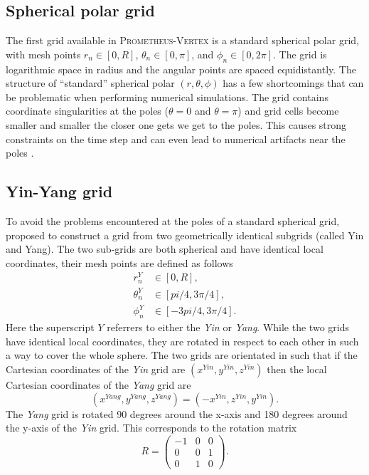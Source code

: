 \subsection{Spherical polar grid}
The first grid available in \textsc{Prometheus-Vertex} is a standard spherical polar grid, 
with mesh points $r_n \in [0, R]$, $\theta_n \in [0, \pi]$, and $\phi_n \in [0, 2\pi]$.
The grid is logarithmic space in radius and the angular points are spaced equidistantly.  
The structure of ``standard'' spherical polar $(r, \theta, \phi)$ has a few shortcomings that
can be problematic when performing numerical simulations. 
The grid contains coordinate singularities at the poles ($\theta = 0$ and $\theta = \pi$)
and grid cells become smaller and smaller the closer one gets we get to the poles. This causes strong constraints on the time step and
can even lead to numerical artifacts near the poles \citep{wongwathanarat_10a,mueller_15b}.

\subsection{Yin-Yang grid}
To avoid the problems encountered at the poles of a standard spherical grid, \cite{kageyama_04} proposed to
construct a grid from two geometrically identical subgrids (called Yin and Yang). 
The two sub-grids are both spherical and have identical local coordinates, their mesh points are defined as follows
\begin{align}
r_n^{Y} &\in [0, R], \\
\theta_n^{Y} &\in [pi/4, 3\pi/4], \\
\phi_n^{Y} &\in [-3pi/4, 3\pi/4].
\end{align} 
Here the superscript $Y$ referrers to either the \textit{Yin} or \textit{Yang}. While the two grids
have identical local coordinates, they are rotated in respect to each other in such a way
to cover the whole sphere. The two grids are orientated in such that if 
the Cartesian coordinates of the \textit{Yin} grid are $(x^{Yin},y^{Yin},z^{Yin})$
then the local Cartesian coordinates of the \textit{Yang} grid are
\begin{equation}
(x^{Yang},y^{Yang},z^{Yang}) = (-x^{Yin},z^{Yin},y^{Yin}).
\end{equation} 
The \textit{Yang} grid is rotated 90 degrees around the x-axis
and 180 degrees around the y-axis of the \textit{Yin} grid. 
This corresponds to the rotation matrix
\begin{equation} \label{eqT:pij}
R = 
  \begin{pmatrix}
    -1 & 0 & 0  \\
    0 & 0 & 1 \\
    0 & 1 & 0
  \end{pmatrix}.
\end{equation}

